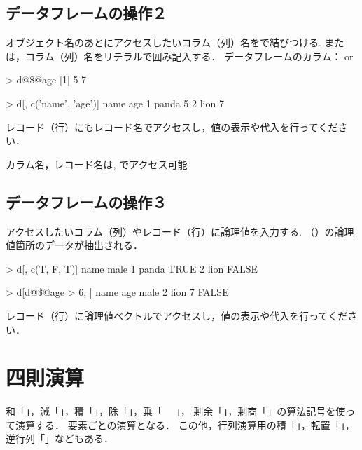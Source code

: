 \documentclass[../main]{subfiles}
\begin{document}
\subsection{データフレームの操作２}

{
  オブジェクト名のあとにアクセスしたいコラム（列）名を\cs{\$}で結びつける.
  または，コラム（列）名をリテラルで囲み記入する．
  データフレームのカラム：  or 
}

\begin{ConsoleR}
  > d@\$@age
  [1] 5 7

  > d[, c('name', 'age')]
     name age
  1 panda   5
  2  lion   7
\end{ConsoleR}

\begin{exercise}
  レコード（行）にもレコード名でアクセスし，値の表示や代入を行ってください．
  \tcblower
\end{exercise}

カラム名，レコード名は, でアクセス可能

\subsection{データフレームの操作３}

{
  アクセスしたいコラム（列）やレコード（行）に論理値を入力する.
  （）の論理値箇所のデータが抽出される．
}

\begin{ConsoleR}
> d[, c(T, F, T)]
    name  male
1 panda  TRUE
2  lion FALSE

> d[d@\$@age > 6, ]
name age  male
2 lion 7 FALSE
\end{ConsoleR}

\begin{exercise}
  レコード（行）に論理値ベクトルでアクセスし，値の表示や代入を行ってください．
  \tcblower
\end{exercise}

\section{四則演算}

{
  和「\cs{+}」，減「\cs{-}」，積「\cs{*}」，除「\cs{/}」，乗「~~\cs{\^} 」，
  剰余「\cs{\%\%}」，剰商「\cs{\%/\%}」の算法記号を使って演算する．
  要素ごとの演算となる．
}
この他，行列演算用の積「\cs{\%*\%}」，転置「」，逆行列「」などもある．
\end{document}
